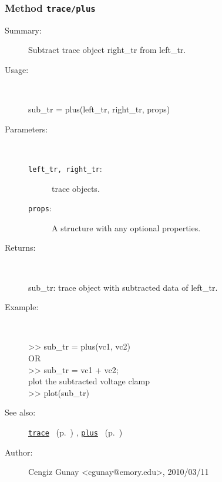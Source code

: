\subsubsection[Method \texttt{plus}]{Method \texttt{trace/plus}}%
%
\label{ref_trace__plus}%
\hypertarget{ref_trace__plus}{}%
\begin{description}
\item[Summary:]Subtract trace object right\_tr from left\_tr.
%
\item[Usage:]~%
\begin{lyxcode}%
sub\_tr = plus(left\_tr, right\_tr, props)
%
\end{lyxcode}%
%
%
\item[Parameters:]~
\begin{description}%
\item[\texttt{left\_tr, right\_tr}:]
 trace objects.
\item[\texttt{props}:]
 A structure with any optional properties.
\end{description}%
%
\item[Returns:
]~

   sub\_tr: trace object with subtracted data of left\_tr.
%
\item[Example:]~
\begin{lyxcode} >> sub\_tr = plus(vc1, vc2)
\\%
 OR
\\%
 >> sub\_tr = vc1 + vc2;
\\%
 plot the subtracted voltage clamp
\\%
 >> plot(sub\_tr)
\\%
\end{lyxcode}
%
\item[See also:]%
\hyperlink{ref_trace}{\texttt{trace}}%
\ (p.~\pageref{ref_trace})%
%
, \hyperlink{ref_plus}{\texttt{plus}}%
\ (p.~\pageref{ref_plus})%
%
%
\item[Author:]%
Cengiz Gunay <cgunay@emory.edu>, 2010/03/11
%
\end{description}
\methodline%
